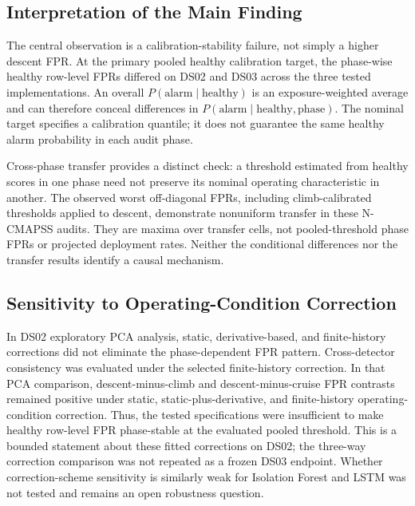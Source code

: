 \documentclass[10pt,twocolumn]{article}
\begin{document}
\subsection{Interpretation of the Main Finding}\label{interpretation-of-the-main-finding}

The central observation is a calibration-stability failure, not simply a higher descent FPR. At the primary pooled healthy calibration target, the phase-wise healthy row-level FPRs differed on DS02 and DS03 across the three tested implementations. An overall \(P(\mathrm{alarm}\mid\mathrm{healthy})\) is an exposure-weighted average and can therefore conceal differences in \(P(\mathrm{alarm}\mid\mathrm{healthy},\mathrm{phase})\). The nominal target specifies a calibration quantile; it does not guarantee the same healthy alarm probability in each audit phase.

Cross-phase transfer provides a distinct check: a threshold estimated from healthy scores in one phase need not preserve its nominal operating characteristic in another. The observed worst off-diagonal FPRs, including climb-calibrated thresholds applied to descent, demonstrate nonuniform transfer in these N-CMAPSS audits. They are maxima over transfer cells, not pooled-threshold phase FPRs or projected deployment rates. Neither the conditional differences nor the transfer results identify a causal mechanism.

\subsection{Sensitivity to Operating-Condition Correction}\label{sensitivity-to-operating-condition-correction-1}

In DS02 exploratory PCA analysis, static, derivative-based, and finite-history corrections did not eliminate the phase-dependent FPR pattern. Cross-detector consistency was evaluated under the selected finite-history correction. In that PCA comparison, descent-minus-climb and descent-minus-cruise FPR contrasts remained positive under static, static-plus-derivative, and finite-history operating-condition correction. Thus, the tested specifications were insufficient to make healthy row-level FPR phase-stable at the evaluated pooled threshold. This is a bounded statement about these fitted corrections on DS02; the three-way correction comparison was not repeated as a frozen DS03 endpoint. Whether correction-scheme sensitivity is similarly weak for Isolation Forest and LSTM was not tested and remains an open robustness question.
\end{document}
